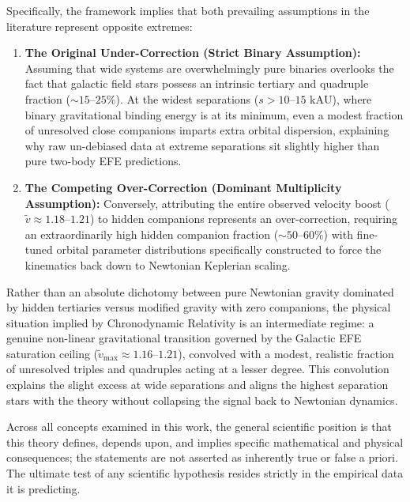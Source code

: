 \documentclass[aps,prd,reprint,superscriptaddress,nofootinbib,twocolumn,floatfix]{revtex4-2}
\begin{document}
Specifically, the framework implies that both prevailing assumptions in the literature represent opposite extremes:
\begin{enumerate}\setlength{\itemsep}{1pt}\setlength{\parskip}{0pt}
    \item \textbf{The Original Under-Correction (Strict Binary Assumption):} Assuming that wide systems are overwhelmingly pure binaries overlooks the fact that galactic field stars possess an intrinsic tertiary and quadruple fraction ($\sim 15\text{--}25\%$). At the widest separations ($s > 10\text{--}15\text{ kAU}$), where binary gravitational binding energy is at its minimum, even a modest fraction of unresolved close companions imparts extra orbital dispersion, explaining why raw un-debiased data at extreme separations sit slightly higher than pure two-body EFE predictions.
    \item \textbf{The Competing Over-Correction (Dominant Multiplicity Assumption):} Conversely, attributing the entire observed velocity boost ($\tilde{v} \approx 1.18\text{--}1.21$) to hidden companions represents an over-correction, requiring an extraordinarily high hidden companion fraction ($\sim 50\text{--}60\%$) with fine-tuned orbital parameter distributions specifically constructed to force the kinematics back down to Newtonian Keplerian scaling.
\end{enumerate}

Rather than an absolute dichotomy between pure Newtonian gravity dominated by hidden tertiaries versus modified gravity with zero companions, the physical situation implied by Chronodynamic Relativity is an intermediate regime: a genuine non-linear gravitational transition governed by the Galactic EFE saturation ceiling ($\tilde{v}_{\text{max}} \approx 1.16\text{--}1.21$), convolved with a modest, realistic fraction of unresolved triples and quadruples acting at a lesser degree. This convolution explains the slight excess at wide separations and aligns the highest separation stars with the theory without collapsing the signal back to Newtonian dynamics.

Across all concepts examined in this work, the general scientific position is that this theory defines, depends upon, and implies specific mathematical and physical consequences; the statements are not asserted as inherently true or false a priori. The ultimate test of any scientific hypothesis resides strictly in the empirical data it is predicting.
\end{document}
